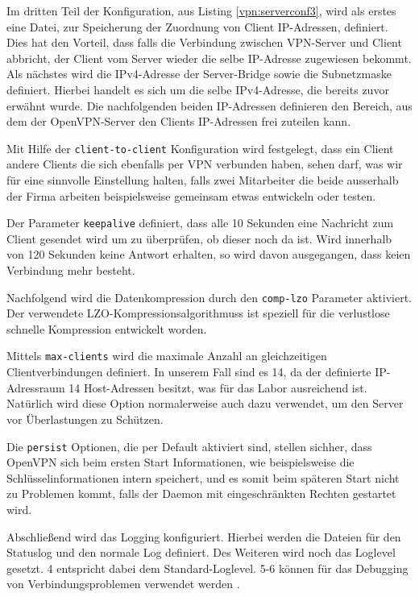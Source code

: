 

Im dritten Teil der Konfiguration, aus Listing \ref{vpn:serverconf3}, wird als erstes eine Datei, zur Speicherung der Zuordnung von Client IP-Adressen, definiert. Dies hat den Vorteil, dass falls die Verbindung zwischen VPN-Server und Client abbricht, der Client vom Server wieder die selbe IP-Adresse zugewiesen bekommt. Als nächstes wird die IPv4-Adresse der Server-Bridge sowie die Subnetzmaske definiert. Hierbei handelt es sich um die selbe IPv4-Adresse, die bereits zuvor erwähnt wurde. Die nachfolgenden beiden IP-Adressen definieren den Bereich, aus dem der OpenVPN-Server den Clients IP-Adressen frei zuteilen kann.

Mit Hilfe der \texttt{client-to-client} Konfiguration wird festgelegt, dass ein Client andere Clients die sich ebenfalls per VPN verbunden haben, sehen darf, was wir für eine sinnvolle Einstellung halten, falls zwei Mitarbeiter die beide ausserhalb der Firma arbeiten beispielsweise gemeinsam etwas entwickeln oder testen.

Der Parameter \texttt{keepalive} definiert, dass alle 10 Sekunden eine Nachricht zum Client gesendet wird um zu überprüfen, ob dieser noch da ist. Wird innerhalb von 120 Sekunden keine Antwort erhalten, so wird davon ausgegangen, dass keien Verbindung mehr besteht.

Nachfolgend wird die Datenkompression durch den \texttt{comp-lzo} Parameter aktiviert. Der verwendete LZO-Kompressionsalgorithmuss ist speziell für die verlustlose schnelle Kompression entwickelt worden.

Mittels \texttt{max-clients} wird die maximale Anzahl an gleichzeitigen Clientverbindungen definiert. In unserem Fall sind es 14, da der definierte IP-Adressraum 14 Host-Adressen besitzt, was für das Labor ausreichend ist. Natürlich wird diese Option normalerweise auch dazu verwendet, um den Server vor Überlastungen zu Schützen.

Die \texttt{persist} Optionen, die per Default aktiviert sind, stellen sichher, dass OpenVPN sich beim ersten Start Informationen, wie beispielsweise die Schlüsselinformationen intern speichert, und es somit beim späteren Start nicht zu Problemen kommt, falls der Daemon mit eingeschränkten Rechten gestartet wird.

Abschließend wird das Logging konfiguriert. Hierbei werden die Dateien für den Statuslog und den normale Log definiert. Des Weiteren wird noch das Loglevel gesetzt. 4 entspricht dabei dem Standard-Loglevel. 5-6 können für das Debugging von Verbindungsproblemen verwendet werden \cite{OpenVPN}.

